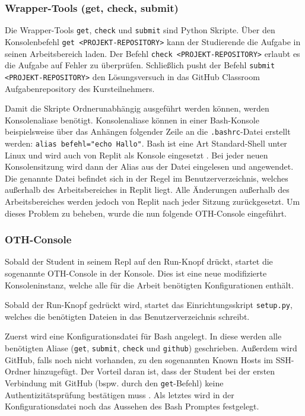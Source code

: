 \subsubsection{Wrapper-Tools (get, check, submit)}
Die Wrapper-Tools \texttt{get}, \texttt{check} und \texttt{submit} sind Python
Skripte. Über den Konsolenbefehl \texttt{get <PROJEKT-REPOSITORY>} kann der
Studierende die Aufgabe in seinen Arbeitsbereich laden. Der Befehl 
\texttt{check <PROJEKT-REPOSITORY>} erlaubt es die Aufgabe auf Fehler zu
überprüfen. Schließlich pusht der Befehl \texttt{submit <PROJEKT-REPOSITORY>}
den Lösungsversuch in das GitHub Classroom Aufgabenrepository des
Kursteilnehmers.

Damit die Skripte Ordnerunabhängig ausgeführt werden können, werden
Konsolenaliase benötigt. Konsolenaliase können in einer Bash-Konsole
beispielsweise über das Anhängen folgender Zeile an die \texttt{.bashrc}-Datei
erstellt werden: \texttt{alias befehl="echo Hallo"}. Bash ist eine Art \glqq Standard-Shell\grqq{} unter Linux und wird auch von Replit als Konsole
eingesetzt \cite{bash}. Bei jeder neuen Konsolensitzung wird dann der Alias aus
der Datei eingelesen und angewendet. Die genannte Datei befindet sich in der
Regel im Benutzerverzeichnis, welches außerhalb des Arbeitsbereiches in Replit
liegt. Alle Änderungen außerhalb des Arbeitsbereiches werden jedoch von Replit
nach jeder Sitzung zurückgesetzt. Um dieses Problem zu beheben, wurde die nun
folgende OTH-Console eingeführt.

\subsubsection{OTH-Console}
Sobald der Student in seinem Repl auf den Run-Knopf drückt, startet die
sogenannte OTH-Console in der Konsole. Dies ist eine neue
modifizierte Konsoleninstanz, welche alle für die Arbeit benötigten
Konfigurationen enthält.

Sobald der Run-Knopf gedrückt wird, startet das Einrichtungsskript
\texttt{setup.py}, welches die benötigten Dateien in das Benutzerverzeichnis
schreibt.

Zuerst wird eine Konfigurationsdatei für Bash angelegt. In diese
werden alle benötigten Aliase (\texttt{get}, \texttt{submit}, \texttt{check}
und \texttt{github}) geschrieben. Außerdem wird GitHub, falls noch
nicht vorhanden, zu den sogenannten \glqq Known Hosts\grqq{} im SSH-Ordner
hinzugefügt. Der Vorteil daran ist, dass der Student bei der ersten Verbindung
mit GitHub (bspw. durch den \texttt{get}-Befehl) keine Authentizitätsprüfung
bestätigen muss \cite{ssh}. Als letztes wird in der Konfigurationsdatei noch das
Aussehen des Bash Promptes festgelegt.

